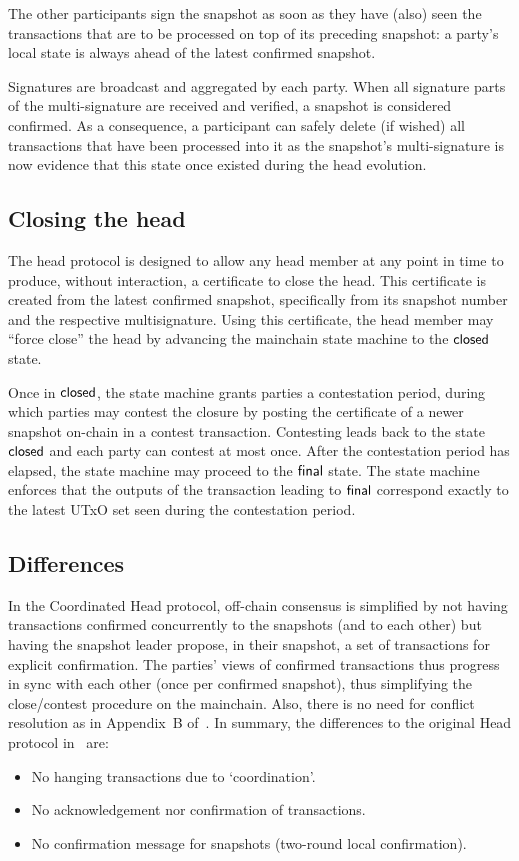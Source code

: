 The other participants sign the snapshot as soon as they have (also) seen the
transactions that are to be processed on top of its preceding snapshot: a
party's local state is always ahead of the latest confirmed snapshot.

Signatures are broadcast and aggregated by each party. When all signature parts
of the multi-signature are received and verified, a snapshot is considered
confirmed. As a consequence, a participant can safely delete (if wished) all
transactions that have been processed into it as the snapshot's multi-signature
is now evidence that this state once existed during the head evolution.

\subsection{Closing the head}

The head protocol is designed to allow any head member at any point in time to
produce, without interaction, a certificate to close the head. This certificate
is created from the latest confirmed snapshot, specifically from its snapshot
number and the respective multisignature. Using this certificate, the head
member may ``force close'' the head by advancing the mainchain state machine to
the $\mathsf{closed}$ state.

Once in $\mathsf{closed}$, the state machine grants parties a contestation period,
during which parties may contest the closure by posting the certificate of a
newer snapshot on-chain in a contest transaction. Contesting leads back to the state
$\mathsf{closed}$ and each party can contest at most once. After the contestation period has elapsed, the state machine may
proceed to the $\mathsf{final}$ state. The state machine enforces that the outputs of
the transaction leading to $\mathsf{final}$ correspond exactly to the latest UTxO set
seen during the contestation period.

\subsection{Differences}
In the Coordinated Head protocol, off-chain consensus is simplified by not
having transactions confirmed concurrently to the snapshots (and to each other)
but having the snapshot leader propose, in their snapshot, a set of transactions
for explicit confirmation. The parties' views of confirmed transactions thus
progress in sync with each other (once per confirmed snapshot), thus simplifying
the close/contest procedure on the mainchain. Also, there is no need for
conflict resolution as in Appendix~B of~\cite{hydrahead20}. In summary, the
differences to the original Head protocol in~\cite{hydrahead20} are:

\begin{itemize}
  \item No hanging transactions due to `coordination'.
  \item No acknowledgement nor confirmation of transactions.
  \item No confirmation message for snapshots (two-round local confirmation).
\end{itemize}

